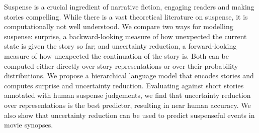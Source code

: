 Suspense is a crucial ingredient of narrative fiction, engaging readers and making stories compelling. While there is a vast theoretical literature on suspense, it is computationally not well understood. We compare two ways for modelling suspense: surprise, a  backward-looking measure of how unexpected the current state is given the story so far; and uncertainty reduction, a forward-looking measure of how unexpected the continuation of the story is.  Both can be computed either directly over story representations or over their probability distributions. We propose a hierarchical language model that encodes stories and computes surprise and uncertainty reduction. Evaluating against short stories annotated with human suspense judgements, we find that uncertainty reduction over representations is the best predictor, resulting in near human accuracy. We also show that uncertainty reduction can be used to predict suspenseful events in movie synopses.
